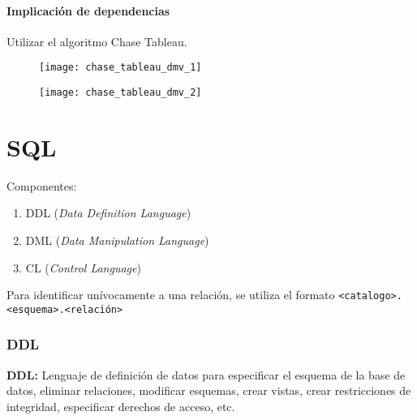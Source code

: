 \documentclass[a4paper, twoside]{article}
\begin{document}
\subsection{Implicación de dependencias}
Utilizar el algoritmo Chase Tableau.

\begin{figure}[H]
	\centering
	\texttt{[image: chase\_tableau\_dmv\_1]}
\end{figure}

\begin{figure}[H]
	\centering
	\texttt{[image: chase\_tableau\_dmv\_2]}
\end{figure}

\newpage
\part{SQL}
Componentes: 
\begin{enumerate}
	\item DDL (\emph{Data Definition Language})
	\item DML (\emph{Data Manipulation Language})
	\item CL (\emph{Control Language})
\end{enumerate}

Para identificar unívocamente a una relación, se utiliza el formato \texttt{<catalogo>.<esquema>.<relación>}

\section{DDL}
\textbf{DDL:} Lenguaje de definición de datos para especificar el esquema de la base de datos, eliminar relaciones, modificar esquemas, crear vistas, crear restricciones de integridad, especificar derechos de acceso, etc.
\end{document}
